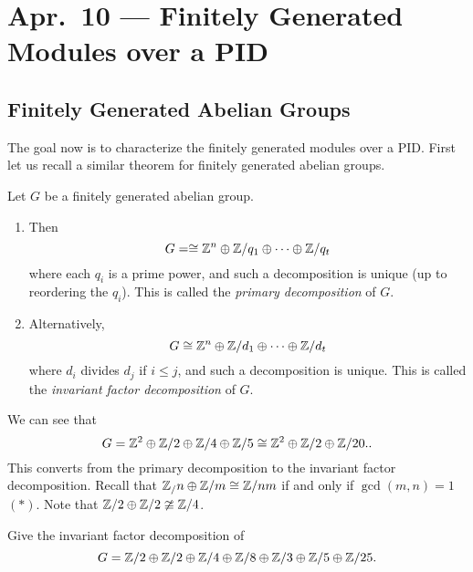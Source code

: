 \chapter{Apr.~10 --- Finitely Generated Modules over a PID}

\section{Finitely Generated Abelian Groups}
\begin{remark}
The goal now is to characterize the finitely generated
modules over a PID. First let us recall a similar theorem
for finitely generated abelian groups.
\end{remark}

\begin{theorem}
  \label{thm:finite-gen-groups}
  Let $G$ be a finitely generated abelian group.
  \begin{enumerate}
    \item Then
      \[
        G = \cong \mathbb{Z}^n \oplus \mathbb{Z} / q_1 \oplus \dots \oplus \mathbb{Z} / q_t
      \]
      where each $q_i$ is a prime power, and such a
      decomposition is unique (up to reordering
      the $q_i$). This is called the \emph{primary
      decomposition} of $G$.
    \item Alternatively,
      \[
        G \cong \mathbb{Z}^n \oplus \mathbb{Z} / d_1 \oplus \dots \oplus \mathbb{Z} / d_t
      \]
      where $d_i$ divides $d_j$ if $i \le j$, and
      such a decomposition is unique. This is called
      the \emph{invariant factor decomposition} of $G$.
  \end{enumerate}
\end{theorem}

\begin{example}
  We can see that
  \[G = \mathbb{Z}^2 \oplus \mathbb{Z} / 2 \oplus \mathbb{Z} / 4 \oplus \mathbb{Z} / 5 \cong \mathbb{Z}^2 \oplus \mathbb{Z} / 2 \oplus \mathbb{Z} / 20..\]
  This converts from the primary decomposition to the invariant factor decomposition.
  Recall that $\mathbb{Z}_ / n \oplus \mathbb{Z} / m \cong \mathbb{Z} / nm$
  if and only if $\gcd(m, n) = 1$ $(*)$. Note that
  $\mathbb{Z} / 2 \oplus \mathbb{Z} / 2 \ncong \mathbb{Z} / 4$.
\end{example}

\begin{exercise}
  Give the invariant factor decomposition of
  \[
    G = \mathbb{Z} / 2 \oplus \mathbb{Z} / 2 \oplus \mathbb{Z} / 4 \oplus \mathbb{Z} / 8 \oplus \mathbb{Z} / 3 \oplus \mathbb{Z} / 5 \oplus \mathbb{Z} / 25.
  \]
\end{exercise}

